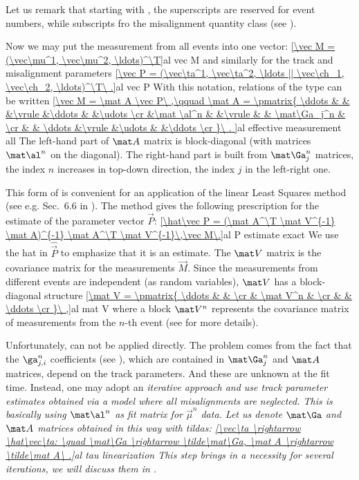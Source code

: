 Let us remark that starting with , the superscripts are reserved for event numbers, while subscripts fro the misalignment quantity class (see ).


Now we may put the measurement from all events into one vector:
\eqref{\vec M = (\vec\mu^1, \vec\mu^2, \ldots)^\T}{al vec M}
and similarly for the track and misalignment parameters
\eqref{\vec P = (\vec\ta^1, \vec\ta^2, \ldots || \vec\ch_1, \vec\ch_2, \ldots)^\T\ .}{al vec P}
With this notation, relations of the type  can be written
\eqref{\vec M = \mat A \vec P\ ,\qquad
	\mat A = \pmatrix{
	\ddots & 		&		&\vrule	&\ddots	&				&\udots	\cr
		&\mat \al^n	&		&\vrule	&		& \mat\Ga_j^n	&	\cr
		&		& \ddots	&\vrule	&\udots	&				&\ddots	\cr
	}\ .
}{al effective measurement all}
The left-hand part of $\mat A$ matrix is block-diagonal (with matrices $\mat\al^n$ on the diagonal). The right-hand part is built from $\mat\Ga_j^n$ matrices, the index $n$ increases in top-down direction, the index $j$ in the left-right one.

This form of  is convenient for an application of the linear Least Squares method (see e.g. Sec.~6.6 in ). The method gives the following prescription for the estimate of the parameter vector $\vec P$:
\eqref{\hat\vec P = (\mat A^\T \mat V^{-1} \mat A)^{-1} \mat A^\T \mat V^{-1}\,\vec M\.}{al P estimate exact}
We use the hat in $\hat\vec P$ to emphasize that it is an estimate. The $\mat V$ matrix is the covariance matrix for the measurements $\vec M$. Since the measurements from different events are independent (as random variables), $\mat V$ has a block-diagonal structure
\eqref{\mat V = \pmatrix{
\ddots	&			&			\cr
		& \mat V^n	&			\cr
		&			& \ddots	\cr
}\ ,}{al mat V}
where a block $\mat V^n$ represents the covariance matrix of measurements from the $n$-th event (see  for more details).

Unfortunately,  can not be applied directly. The problem comes from the fact that the $\ga^n_{j,i}$ coefficients (see ), which are contained in $\mat\Ga_j^n$ and $\mat A$ matrices, depend on the track parameters. And these are unknown at the fit time. Instead, one may adopt an \em{iterative} approach and use track parameter estimates obtained via a model where all misalignments are neglected. This is basically using $\mat \al^n$ as fit matrix for $\vec \mu^n$ data. Let us denote $\mat\Ga$ and $\mat A$ matrices obtained in this way with tildas:
\eqref{\vec\ta \rightarrow \hat\vec\ta: \quad \mat\Ga \rightarrow \tilde\mat\Ga, \mat A \rightarrow \tilde\mat A\ .}{al tau linearization}
This step brings in a necessity for several iterations, we will discuss them in .

